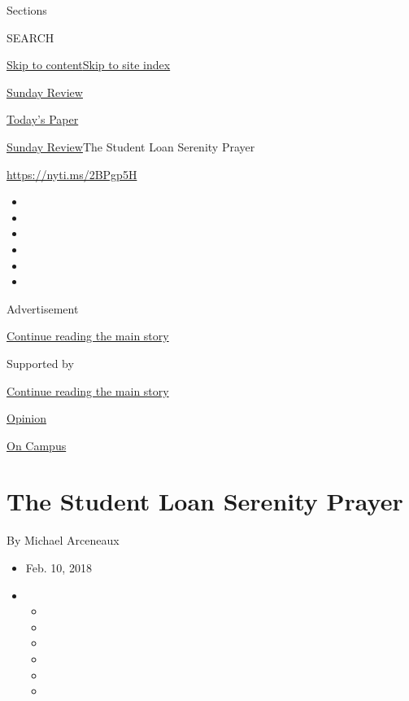 Sections

SEARCH

\protect\hyperlink{site-content}{Skip to
content}\protect\hyperlink{site-index}{Skip to site index}

\href{https://www.nytimes3xbfgragh.onion/section/opinion/sunday}{Sunday
Review}

\href{https://myaccount.nytimes3xbfgragh.onion/auth/login?response_type=cookie\&client_id=vi}{}

\href{https://www.nytimes3xbfgragh.onion/section/todayspaper}{Today's
Paper}

\href{/section/opinion/sunday}{Sunday Review}\textbar{}The Student Loan
Serenity Prayer

\url{https://nyti.ms/2BPgp5H}

\begin{itemize}
\item
\item
\item
\item
\item
\item
\end{itemize}

Advertisement

\protect\hyperlink{after-top}{Continue reading the main story}

Supported by

\protect\hyperlink{after-sponsor}{Continue reading the main story}

\href{/section/opinion}{Opinion}

\href{/column/on-campus}{On Campus}

\hypertarget{the-student-loan-serenity-prayer}{%
\section{The Student Loan Serenity
Prayer}\label{the-student-loan-serenity-prayer}}

By Michael Arceneaux

\begin{itemize}
\item
  Feb. 10, 2018
\item
  \begin{itemize}
  \item
  \item
  \item
  \item
  \item
  \item
  \end{itemize}
\end{itemize}

